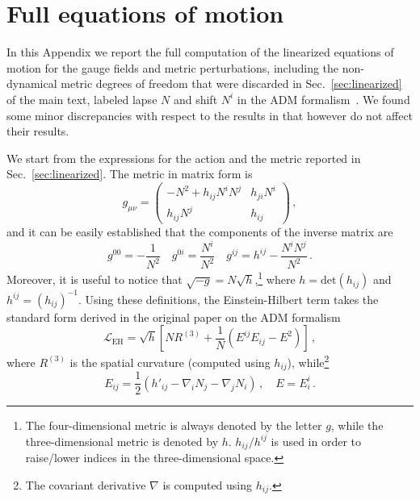 
\section{Full equations of motion \label{app:fulleom}}

\noindent In this Appendix we report the full computation of the linearized equations of motion for the gauge fields and metric perturbations, including the non-dynamical metric degrees of freedom that were discarded in Sec.~\ref{sec:linearized} of the main text, labeled lapse $N$ and shift $N^i$ in the ADM formalism~\cite{Arnowitt:1962hi}. We found some minor discrepancies with respect to the results in \cite{Adshead:2013nka} that however do not affect their results.

We start from the expressions for the action and the metric reported in Sec.~\ref{sec:linearized}. The metric in matrix form is
\begin{equation}
g_{\mu \nu} =
\begin{pmatrix}
-N^2 + h_{ij} N^i N^j & h_{ji} N^i \\
h_{ij} N^j & h_{ij}
\end{pmatrix}\,,
\end{equation}
and it can be easily established that the components of the inverse matrix are
\begin{equation}
g^{00} = - \frac{1}{N^2} \quad g^{0i} = \frac{N^i}{N^2} \quad g^{ij} = h^{ij} - \frac{N^i N^j}{N^2} \,.
\end{equation}
Moreover, it is useful to notice that $\sqrt{-g} = N \sqrt{h}$,\footnote{The four-dimensional metric is always denoted by the letter $g$, while the three-dimensional metric is denoted by $h$. $h_{ij}/h^{ij}$ is used in order to raise/lower indices in the three-dimensional space.} where $h = \text{det} \left(h_{ij}\right)$ and $h^{ij} = \left(h_{ij}\right)^{-1}$. Using these definitions, the Einstein-Hilbert term takes the standard form derived in the original paper on the ADM formalism~\cite{Arnowitt:1962hi}
\begin{equation}
\label{eq:FullEH}
\mathcal{L}_{\text{EH}} = \sqrt{h} \left[N R^{(3)} + \frac{1}{N} \left(E^{ij} E_{ij} - E^2\right) \right]\,,
\end{equation}
where $R^{(3)}$ is the spatial curvature (computed using $h_{ij}$), while\footnote{The covariant derivative $\nabla$ is computed using $h_{ij}$.}
\begin{equation}
E_{ij} = \frac{1}{2} \left(h'_{ij} - \nabla_i N_j - \nabla_j N_i\right) \,, \quad E = E^i_i\,.
\end{equation}

